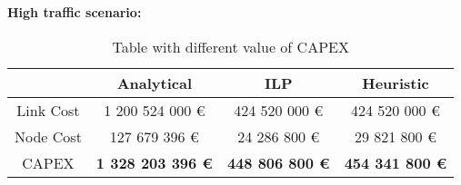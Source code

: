 \vspace{11pt}
\textbf{High traffic scenario:}\\

\begin{table}[h!]
\centering
\begin{tabular}{| c | c | c | c |}
 \hline
   & Analytical & ILP & Heuristic \\
 \hline\hline
 Link Cost & 1 200 524 000 \euro & 424 520 000 \euro & 424 520 000 \euro \\
 Node Cost & 127 679 396 \euro & 24 286 800 \euro & 29 821 800 \euro \\
 CAPEX & \textbf{1 328 203 396 \euro} & \textbf{448 806 800 \euro*} & \textbf{454 341 800 \euro} \\
 \hline
\end{tabular}
\caption{Table with different value of CAPEX }
\label{table_comparative_transp_protec_ref_3}
\end{table}

